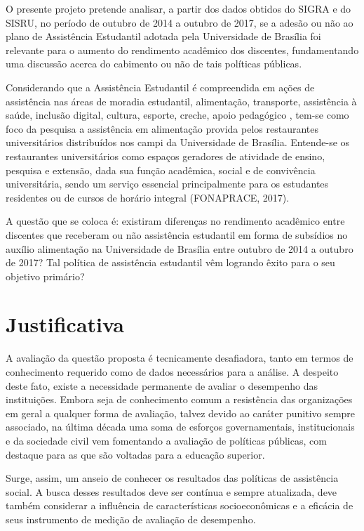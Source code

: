 O presente projeto pretende analisar, a partir dos dados obtidos do \acrfull{SIGRA} e do \acrfull{SISRU}, no período de outubro de 2014 a outubro de 2017, se a adesão ou não ao plano de Assistência Estudantil adotada pela Universidade de Brasília foi relevante para o aumento do rendimento acadêmico dos discentes, fundamentando uma discussão acerca do cabimento ou não de tais políticas públicas.

Considerando que a Assistência Estudantil é compreendida em ações de assistência  nas áreas de moradia estudantil, alimentação, transporte, assistência à saúde, inclusão digital, cultura, esporte, creche, apoio pedagógico \cite{2007PORTARIA2007}, tem-se como foco da pesquisa a assistência em alimentação provida pelos restaurantes universitários distribuídos nos campi da Universidade de Brasília. Entende-se os restaurantes universitários como espaços geradores de atividade de ensino, pesquisa e extensão, dada sua função acadêmica, social e de convivência universitária, sendo um serviço essencial principalmente para os estudantes residentes ou de cursos de horário integral (FONAPRACE, 2017).

A questão que se coloca é: existiram diferenças no rendimento acadêmico entre discentes que receberam ou não assistência estudantil em forma de subsídios no auxílio alimentação na Universidade de Brasília entre outubro de 2014 a outubro de 2017? Tal política de assistência estudantil vêm logrando êxito para o seu objetivo primário?


\section{Justificativa}%

A avaliação da questão proposta é tecnicamente desafiadora, tanto em termos de conhecimento requerido como de dados necessários para a análise. A despeito deste fato, existe a necessidade permanente de avaliar o desempenho das instituições. Embora seja de conhecimento comum a resistência das organizações em geral a qualquer forma de avaliação, talvez devido ao caráter punitivo sempre associado, na última década uma soma de esforços governamentais, institucionais e da sociedade civil vem fomentando a avaliação de  políticas públicas, com destaque para as que são voltadas para a educação superior.

Surge, assim, um anseio de conhecer os resultados das políticas de assistência social. A busca desses resultados deve ser contínua e sempre atualizada, deve também considerar a influência de características socioeconômicas e a eficácia de seus instrumento de medição de avaliação de desempenho.

